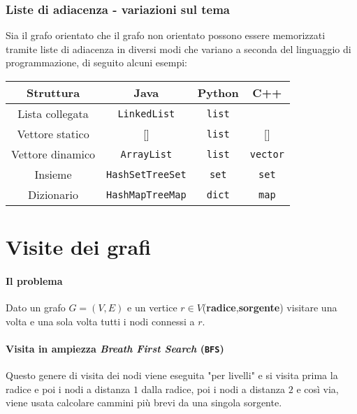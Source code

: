         \subsubsection{Liste di adiacenza - variazioni sul tema}
            Sia il grafo orientato che il grafo non orientato possono essere memorizzati tramite liste di adiacenza in diversi modi che variano a seconda del linguaggio di programmazione, di seguito alcuni esempi:
            \begin{table}[h]
                \centering
                \begin{tabular}{|c|c|c|c|}
                    \hline
                    \textbf{Struttura} & \textbf{Java} & \textbf{Python} & \textbf{C++} \\
                    \hline
                    Lista collegata & \texttt{LinkedList} & \texttt{list} & \\
                    \hline
                    Vettore statico & [] & \texttt{list} & [] \\
                    \hline
                    Vettore dinamico & \texttt{ArrayList} & \texttt{list} & \texttt{vector} \\
                    \hline
                    Insieme & \texttt{HashSet}\texttt{TreeSet} & \texttt{set} & \texttt{set} \\
                    \hline
                    Dizionario & \texttt{HashMap}\newline\texttt{TreeMap} & \texttt{dict} & \texttt{map} \\
                    \hline
                \end{tabular}
            \end{table}
\section{Visite dei grafi}
    \paragraph{Il problema} Dato un grafo $G = (V,E)$ e un vertice $r\in V$(\textbf{radice},\textbf{sorgente}) visitare una volta e una sola volta tutti i nodi connessi a $r$.
    \paragraph{Visita in ampiezza \textit{Breath First Search} (\texttt{BFS})} Questo genere di visita dei nodi viene eseguita "per livelli" e si visita prima la radice e poi i nodi a distanza $1$ dalla radice, poi i nodi a distanza $2$ e così via, viene usata calcolare cammini più brevi da una singola sorgente.
